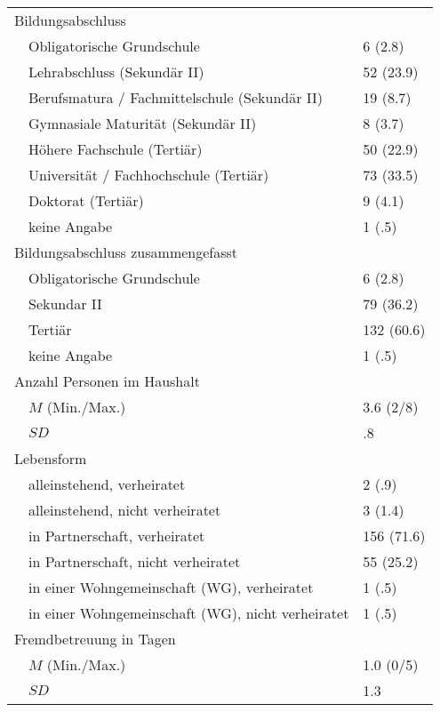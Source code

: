 \begin{longtable}[l]{m{0.5em}  m{25em}  m{5em}}
  \multicolumn{2}{l}{Bildungsabschluss} \\
  & Obligatorische Grundschule & 6 (2.8)\\
  & Lehrabschluss (Sekundär II)& 52 (23.9)\\
  & Berufsmatura / Fachmittelschule (Sekundär II) & 19 (8.7)\\
  & Gymnasiale Maturität (Sekundär II) & 8 (3.7)\\
  & Höhere Fachschule (Tertiär) & 50 (22.9)\\
  & Universität / Fachhochschule (Tertiär) & 73 (33.5)\\
  & Doktorat (Tertiär) & 9 (4.1)\\
  & keine Angabe & 1 (.5)\\
  
  \multicolumn{2}{l}{Bildungsabschluss zusammengefasst} \\
  & Obligatorische Grundschule & 6 (2.8)\\
  & Sekundar II & 79 (36.2)\\
  & Tertiär & 132 (60.6)\\
  & keine Angabe & 1 (.5)\\
  
  \multicolumn{2}{l}{Anzahl Personen im Haushalt} \\
  &  $M$ (Min./Max.) & 3.6 (2/8)\\
  & $SD$ &  .8\\
  
  \multicolumn{2}{l}{Lebensform} \\
  & alleinstehend, verheiratet & 2 (.9)\\
  & alleinstehend, nicht verheiratet & 3 (1.4)\\
  & in Partnerschaft, verheiratet & 156 (71.6)\\
  & in Partnerschaft, nicht verheiratet & 55 (25.2)\\
  & in einer Wohngemeinschaft (WG), verheiratet & 1 (.5)\\
  & in einer Wohngemeinschaft (WG), nicht verheiratet & 1 (.5)\\
  
  \multicolumn{2}{l}{Fremdbetreuung in Tagen} \\
  &  $M$ (Min./Max.) & 1.0 (0/5)\\
  & $SD$ &  1.3\\
\end{longtable}
